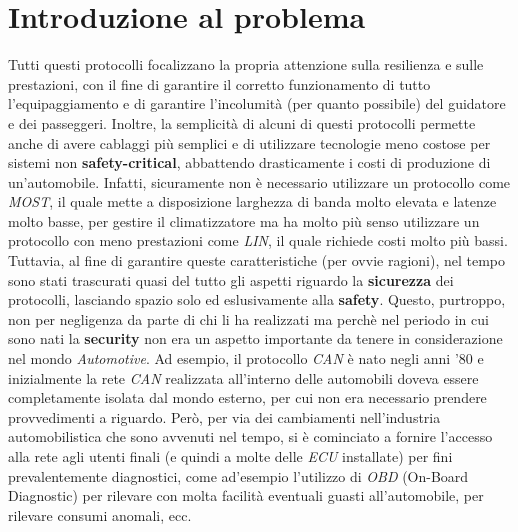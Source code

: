 \section{Introduzione al problema}
Tutti questi protocolli focalizzano la propria attenzione sulla resilienza e sulle prestazioni, con il fine di garantire il corretto funzionamento di tutto l'equipaggiamento e di garantire l'incolumità (per quanto possibile) del guidatore e dei passeggeri. Inoltre, la semplicità di alcuni di questi protocolli permette anche di avere cablaggi più semplici e di utilizzare tecnologie meno costose per sistemi non \textbf{safety-critical}, abbattendo drasticamente i costi di produzione di un'automobile. Infatti, sicuramente non è necessario utilizzare un protocollo come \emph{MOST}, il quale mette a disposizione larghezza di banda molto elevata e latenze molto basse, per gestire il climatizzatore ma ha molto più senso utilizzare un protocollo con meno prestazioni come \emph{LIN}, il quale richiede costi molto più bassi.\\
Tuttavia, al fine di garantire queste caratteristiche (per ovvie ragioni), nel tempo sono stati trascurati quasi del tutto gli aspetti riguardo la \textbf{sicurezza} dei protocolli, lasciando spazio solo ed eslusivamente alla \textbf{safety}. Questo, purtroppo, non per negligenza da parte di chi li ha realizzati ma perchè nel periodo in cui sono nati la \textbf{security} non era un aspetto importante da tenere in considerazione nel mondo \emph{Automotive}. Ad esempio, il protocollo \emph{CAN} è nato negli anni '80 e inizialmente la rete \emph{CAN} realizzata all'interno delle automobili doveva essere completamente isolata dal mondo esterno, per cui non era necessario prendere provvedimenti a riguardo. Però, per via dei cambiamenti nell'industria automobilistica che sono avvenuti nel tempo, si è cominciato a fornire l'accesso alla rete agli utenti finali (e quindi a molte delle \emph{ECU} installate) per fini prevalentemente diagnostici, come ad'esempio l'utilizzo di \emph{OBD} (On-Board Diagnostic) per rilevare con molta facilità eventuali guasti all'automobile, per rilevare consumi anomali, ecc. \cite{bozdal_samie_jennions_2018}

